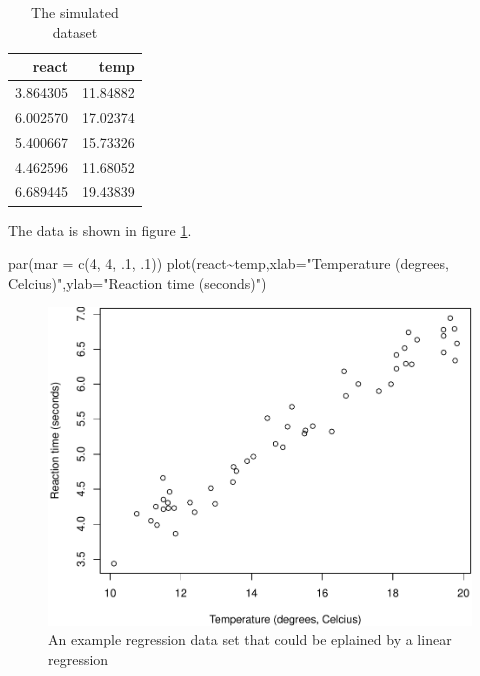 \documentclass[
]{book}
\newenvironment{Shaded}{\begin{snugshade}}{\end{snugshade}}
\newcommand{\AttributeTok}[1]{\textcolor[rgb]{0.77,0.63,0.00}{#1}}
\newcommand{\DecValTok}[1]{\textcolor[rgb]{0.00,0.00,0.81}{#1}}
\newcommand{\FunctionTok}[1]{\textcolor[rgb]{0.00,0.00,0.00}{#1}}
\newcommand{\NormalTok}[1]{#1}
\newcommand{\SpecialCharTok}[1]{\textcolor[rgb]{0.00,0.00,0.00}{#1}}
\newcommand{\StringTok}[1]{\textcolor[rgb]{0.31,0.60,0.02}{#1}}
\begin{document}
\begin{table}

\caption{\label{tab:Ttab1}The simulated dataset}
\centering
\begin{tabular}[t]{rr}
\toprule
react & temp\\
\midrule
3.864305 & 11.84882\\
6.002570 & 17.02374\\
5.400667 & 15.73326\\
4.462596 & 11.68052\\
6.689445 & 19.43839\\
\bottomrule
\end{tabular}
\end{table}

The data is shown in figure \ref{fig:Freg}.

\begin{Shaded}
\begin{Highlighting}[]
\FunctionTok{par}\NormalTok{(}\AttributeTok{mar =} \FunctionTok{c}\NormalTok{(}\DecValTok{4}\NormalTok{, }\DecValTok{4}\NormalTok{, .}\DecValTok{1}\NormalTok{, .}\DecValTok{1}\NormalTok{))}
\FunctionTok{plot}\NormalTok{(react}\SpecialCharTok{\textasciitilde{}}\NormalTok{temp,}\AttributeTok{xlab=}\StringTok{"Temperature (degrees, Celcius)"}\NormalTok{,}\AttributeTok{ylab=}\StringTok{"Reaction time (seconds)"}\NormalTok{)}
\end{Highlighting}
\end{Shaded}

\begin{figure}

{\centering \includegraphics[width=0.8\linewidth]{ECOMODbook_files/figure-latex/Freg-1} 

}

\caption{An example regression data set that could be eplained by a linear regression}\label{fig:Freg}
\end{figure}
\end{document}
